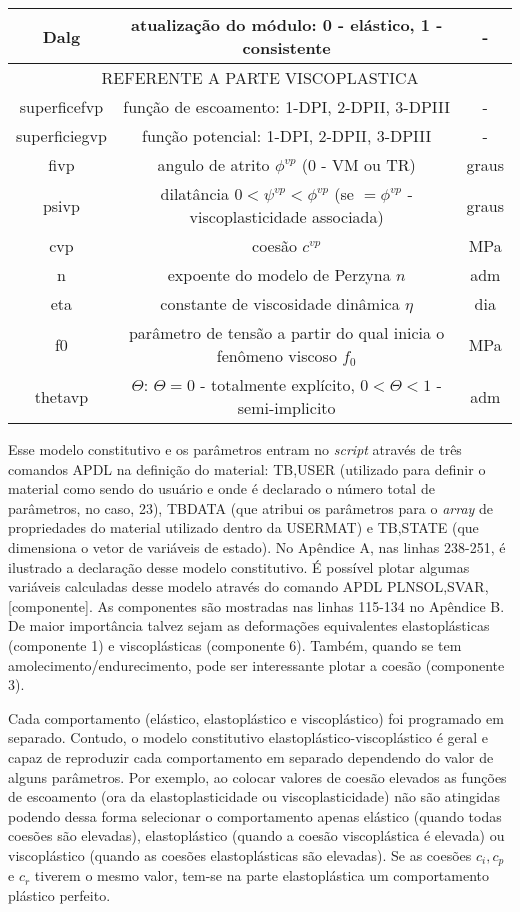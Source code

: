 \begin{table}[H]
\begin{tabular}{c c c}
		Dalg & atualização do módulo: 0 - elástico, 1 - consistente & - \\					
		\hline
		\multicolumn{3}{c}{REFERENTE A PARTE VISCOPLASTICA} \\
		\hline
		superficefvp & função de escoamento: 1-DPI, 2-DPII, 3-DPIII  & - \\
		superficiegvp & função potencial: 1-DPI, 2-DPII, 3-DPIII & - \\
		fivp & angulo de atrito $\phi^{vp}$ (0 - VM ou TR) & graus \\
		psivp & dilatância $0<\psi^{vp}<\phi^ {vp}$ (se $=\phi^{vp}$ - viscoplasticidade associada) & graus \\
		cvp & coesão $c^{vp}$ & MPa \\
		n & expoente do modelo de Perzyna $n$ & adm \\
		eta & constante de viscosidade dinâmica $\eta$ & dia \\
		f0 & parâmetro de tensão a partir do qual inicia o fenômeno viscoso $f_0$ & MPa \\
		thetavp & $\Theta$: $\Theta=0$ - totalmente explícito, $0<\Theta<1$ - semi-implicito & adm \\
		\hline
	\end{tabular}
	\normalsize
\end{table}

Esse modelo constitutivo e os parâmetros entram no \textit{script} através de três comandos APDL na definição do material: TB,USER (utilizado para definir o material como sendo do usuário e onde é declarado o número total de parâmetros, no caso, 23), TBDATA (que atribui os parâmetros para o \textit{array} de propriedades do material utilizado dentro da USERMAT) e TB,STATE (que dimensiona o vetor de variáveis de estado). No Apêndice A, nas linhas 238-251, é ilustrado a declaração desse modelo constitutivo. É possível plotar algumas variáveis calculadas desse modelo através do comando APDL PLNSOL,SVAR,[componente]. As componentes são mostradas nas linhas 115-134 no Apêndice B. De maior importância talvez sejam as deformações equivalentes elastoplásticas (componente 1) e viscoplásticas (componente 6). Também, quando se tem amolecimento/endurecimento, pode ser interessante plotar a coesão (componente 3).
 
Cada comportamento (elástico, elastoplástico e viscoplástico) foi programado em separado. Contudo, o modelo constitutivo elastoplástico-viscoplástico é geral e capaz de reproduzir cada comportamento em separado dependendo do valor de alguns parâmetros. Por exemplo, ao colocar valores de coesão elevados as funções de escoamento (ora da elastoplasticidade ou viscoplasticidade) não são atingidas podendo dessa forma selecionar o comportamento apenas elástico (quando todas coesões são elevadas), elastoplástico (quando a coesão viscoplástica é elevada) ou viscoplástico (quando as coesões elastoplásticas são elevadas). Se as coesões $c_i, c_p$ e $c_r$ tiverem o mesmo valor, tem-se na parte elastoplástica um comportamento plástico perfeito.


